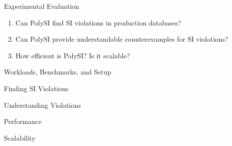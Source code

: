 
\begin{frame}{Experimental Evaluation}
	\begin{center}
		\begin{enumerate}[(1)]
			\setlength{\itemsep}{12pt}
			\item {}
			  Can PolySI find SI violations in production databases?
			\item {}
			  Can PolySI provide understandable counterexamples for SI violations?
			\item {}
			  How efficient is PolySI? Is it scalable?
		\end{enumerate}
	\end{center}
\end{frame}

\begin{frame}{Workloads, Benchmarks, and Setup}
\end{frame}

\begin{frame}{Finding SI Violations}
\end{frame}

\begin{frame}{Understanding Violations}
\end{frame}

\begin{frame}{Performance}
\end{frame}

\begin{frame}{Scalability}
\end{frame}

\begin{frame}{}
\end{frame}

\begin{frame}{}
\end{frame}

\begin{frame}{}
\end{frame}
